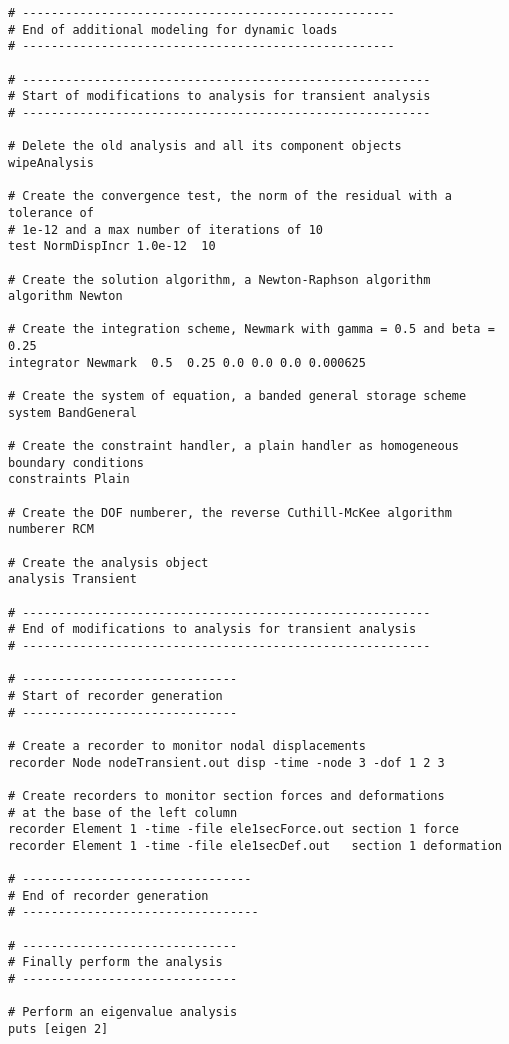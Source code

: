 \documentclass[12pt]{article}
\begin{document}
{\begin{verbatim}
# ----------------------------------------------------
# End of additional modeling for dynamic loads
# ----------------------------------------------------

# ---------------------------------------------------------
# Start of modifications to analysis for transient analysis
# ---------------------------------------------------------

# Delete the old analysis and all its component objects
wipeAnalysis

# Create the convergence test, the norm of the residual with a tolerance of 
# 1e-12 and a max number of iterations of 10
test NormDispIncr 1.0e-12  10 

# Create the solution algorithm, a Newton-Raphson algorithm
algorithm Newton

# Create the integration scheme, Newmark with gamma = 0.5 and beta =  0.25
integrator Newmark  0.5  0.25 0.0 0.0 0.0 0.000625

# Create the system of equation, a banded general storage scheme
system BandGeneral

# Create the constraint handler, a plain handler as homogeneous boundary conditions
constraints Plain

# Create the DOF numberer, the reverse Cuthill-McKee algorithm
numberer RCM

# Create the analysis object
analysis Transient

# ---------------------------------------------------------
# End of modifications to analysis for transient analysis
# ---------------------------------------------------------

# ------------------------------
# Start of recorder generation
# ------------------------------

# Create a recorder to monitor nodal displacements
recorder Node nodeTransient.out disp -time -node 3 -dof 1 2 3

# Create recorders to monitor section forces and deformations
# at the base of the left column
recorder Element 1 -time -file ele1secForce.out section 1 force
recorder Element 1 -time -file ele1secDef.out   section 1 deformation

# --------------------------------
# End of recorder generation
# ---------------------------------

# ------------------------------
# Finally perform the analysis
# ------------------------------

# Perform an eigenvalue analysis
puts [eigen 2]


\end{verbatim}}
\end{document}
